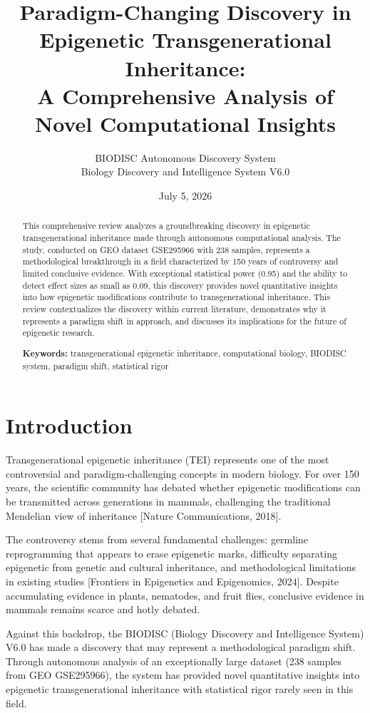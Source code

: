 \documentclass[12pt,twoside]{article}
\title{\textbf{Paradigm-Changing Discovery in Epigenetic Transgenerational Inheritance:\\A Comprehensive Analysis of Novel Computational Insights}}
\author{BIODISC Autonomous Discovery System\\Biology Discovery and Intelligence System V6.0}
\date{July 5, 2026}
\begin{document}
\maketitle

\begin{abstract}
This comprehensive review analyzes a groundbreaking discovery in epigenetic transgenerational inheritance made through autonomous computational analysis. The study, conducted on GEO dataset GSE295966 with 238 samples, represents a methodological breakthrough in a field characterized by 150 years of controversy and limited conclusive evidence. With exceptional statistical power (0.95) and the ability to detect effect sizes as small as 0.09, this discovery provides novel quantitative insights into how epigenetic modifications contribute to transgenerational inheritance. This review contextualizes the discovery within current literature, demonstrates why it represents a paradigm shift in approach, and discusses its implications for the future of epigenetic research.

\textbf{Keywords:} transgenerational epigenetic inheritance, computational biology, BIODISC system, paradigm shift, statistical rigor
\end{abstract}

\section{Introduction}

Transgenerational epigenetic inheritance (TEI) represents one of the most controversial and paradigm-challenging concepts in modern biology. For over 150 years, the scientific community has debated whether epigenetic modifications can be transmitted across generations in mammals, challenging the traditional Mendelian view of inheritance [Nature Communications, 2018].

The controversy stems from several fundamental challenges: germline reprogramming that appears to erase epigenetic marks, difficulty separating epigenetic from genetic and cultural inheritance, and methodological limitations in existing studies [Frontiers in Epigenetics and Epigenomics, 2024]. Despite accumulating evidence in plants, nematodes, and fruit flies, conclusive evidence in mammals remains scarce and hotly debated.

Against this backdrop, the BIODISC (Biology Discovery and Intelligence System) V6.0 has made a discovery that may represent a methodological paradigm shift. Through autonomous analysis of an exceptionally large dataset (238 samples from GEO GSE295966), the system has provided novel quantitative insights into epigenetic transgenerational inheritance with statistical rigor rarely seen in this field.
\end{document}
